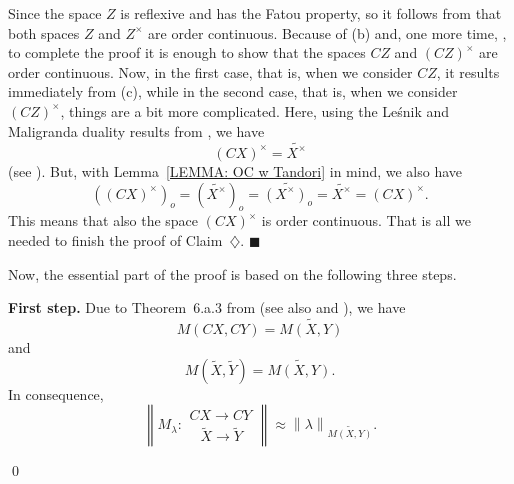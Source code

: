 \documentclass[11pt]{amsart}
\theoremstyle{definition}
\theoremstyle{definition}
\theoremstyle{definition}
\theoremstyle{definition}
\theoremstyle{definition}
\theoremstyle{definition}
\theoremstyle{definition}
\theoremstyle{definition}
\numberwithin{equation}{section}
\numberwithin{equation}{section}
\numberwithin{equation}{section}
\theoremstyle{definition}
\theoremstyle{definition}
\theoremstyle{definition}
\theoremstyle{definition}
\theoremstyle{definition}
\theoremstyle{definition}
\newcommand{\norm}[1]{\left\lVert#1\right\rVert}
\renewenvironment{proof}{\noindent {\bf Proof.}}{\qed}
\begin{document}
\begin{proof}
		Since the space $Z$ is reflexive and has the Fatou property, so it follows from \cite[Corollary~4.4, p.~23]{BS88} that both spaces $Z$ and $Z^{\times}$
		are order continuous. Because of (b) and, one more time, \cite[Corollary~4.4, p.~23]{BS88}, to complete the proof it is enough to show that the spaces
		$CZ$ and $(CZ)^{\times}$ are order continuous. Now, in the first case, that is, when we consider $CZ$, it results immediately from (c),
		while in the second case, that is, when we consider $(CZ)^{\times}$, things are a bit more complicated.
		Here, using the Le{\' s}nik and Maligranda duality results from \cite{LM15a}, we have
		\begin{equation*}
			(CX)^{\times} = \widetilde{X^{\times}}
		\end{equation*}
		(see \cite[Theorem~6]{LM15a}). But, with Lemma~\ref{LEMMA: OC w Tandori} in mind, we also have
		\begin{equation*}
			\left( (CX)^{\times} \right)_o = \left( \widetilde{X^{\times}} \right)_o = \widetilde{(X^{\times})_o} = \widetilde{X^{\times}} = (CX)^{\times}.
		\end{equation*}
		This means that also the space $(CX)^{\times}$ is order continuous. That is all we needed to finish the proof of Claim~$\diamondsuit$.
	\hfill $\blacksquare$
	\vspace{5pt}
	\noindent

	Now, the essential part of the proof is based on the following three steps.
	
	{\bf First step.} Due to Theorem~6.a.3 from \cite{KT24} (see also \cite[Theorem~6]{KLM19} and \cite[pp. 67--77]{Ben96}), we have
	\begin{equation} \label{EQ: multiplikatory ktorych nie ma}
		M(CX,CY) = \widetilde{M(X,Y)}
	\end{equation}
	and
	\begin{equation} \label{EQ: multiplikatory tandori}
		M(\widetilde{X},\widetilde{Y}) = \widetilde{M(X,Y)}.
	\end{equation}
	In consequence,
	\begin{equation*}
		\norm{M_{\lambda} \colon \begin{array}{l} CX \rightarrow CY \\ \;\;\: \widetilde{X} \rightarrow \widetilde{Y} \end{array}}
			\approx  \norm{\lambda}_{\widetilde{M(X,Y)}}.
	\end{equation*}


\end{proof}
\end{document}
